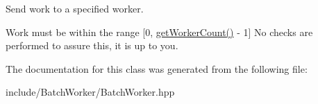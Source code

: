 Send work to a specified worker. 

Work must be within the range \mbox{[}0, \hyperlink{classttl_1_1_batch_worker_afb6f8ca6a57d946787e3d38db1791406}{get\-Worker\-Count()} -\/ 1\mbox{]} No checks are performed to assure this, it is up to you. 

The documentation for this class was generated from the following file\-:\begin{DoxyCompactItemize}
\item 
include/\-Batch\-Worker/Batch\-Worker.\-hpp\end{DoxyCompactItemize}
